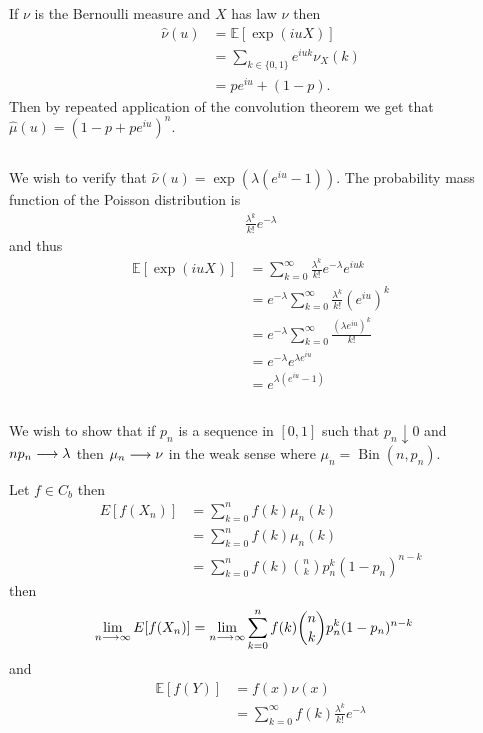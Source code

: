 \documentclass{unswmaths}
\begin{document}
If $ \nu $ is the Bernoulli measure and $ X $ has law $ \nu $ then 
\begin{align}
	\hat{\nu}(u) &= \mathbb{E}[ \exp(iuX)] \\
		&= \sum_{k \in \{ 0, 1\}} e^{iuk} \nu_{X}(k) \\
		&=  pe^{iu} + (1 - p).
\end{align}
Then by repeated application of the convolution theorem we get that
$ \hat{\mu}(u) = (1 - p + pe^{iu})^n $.

\subsection{}
We wish to verify that $ \hat{\nu}(u) = \exp(\lambda(e^{iu} - 1)) $. 
The probability mass function of the Poisson distribution is 
\begin{align}
	\frac{\lambda^k}{k!} e^{-\lambda} 
\end{align}
and thus
\begin{align}
	\mathbb{E}[ \exp(iuX) ] &= \sum_{k=0}^\infty \frac{\lambda^k}{k!} e^{-\lambda} e^{iuk} \\
		&= e^{-\lambda}\sum_{k=0}^\infty \frac{\lambda^k}{k!} (e^{iu})^k \\
		&= e^{-\lambda}\sum_{k=0}^\infty \frac{(\lambda e^{iu})^k}{k!} \\
		&= e^{-\lambda} e^{\lambda e^{iu}} \\
		&= e^{\lambda( e^{iu} - 1)}
\end{align}

\subsection{}

We wish to show that if $ p_n $ is a sequence in $ [0,1] $ such that $ p_n \downarrow 0 $ and $ np_n \longrightarrow \lambda $ then $ \mu_n \longrightarrow \nu $ in the weak sense where $ \mu_n = \operatorname{Bin}(n, p_n) $.

Let $ f \in C_b $ then 
\begin{align}
	E[f(X_n)] &= \sum_{k=0}^n f(k) \mu_n(k) \\
		&= \sum_{k=0}^n f(k) \mu_n(k) \\
		&= \sum_{k=0}^n f(k) {n\choose k} p_n^k(1-p_n)^{n-k}
\end{align}
then
\begin{align}
	\lim_{n\longrightarrow\infty} E[f(X_n)] &= \lim_{n \longrightarrow \infty}\sum_{k=0}^n f(k) {n\choose k} p_n^k(1-p_n)^{n-k}
\end{align}
and
\begin{align}
	\mathbb{E}[f(Y)] &= f(x) \nu(x) \\
		&= \sum_{k=0}^\infty f(k) \frac{\lambda^k}{k!} e^{-\lambda} \\
\end{align}
\end{document}
